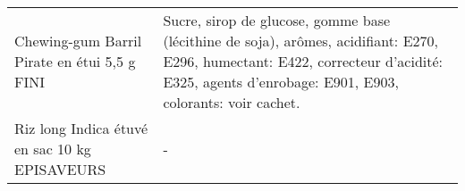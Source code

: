 \begin{longtable}{p{5cm}p{10cm}}
                                                             Chewing-gum Barril Pirate en étui 5,5 g FINI &                                                                                                                                                                                                                                                                                                                                                                                                                                                                                                                                                                                                                                                                                                                                                                                                                                             Sucre, sirop de glucose, gomme base (lécithine de soja), arômes, acidifiant: E270, E296, humectant: E422, correcteur d'acidité: E325, agents d'enrobage: E901, E903, colorants: voir cachet. \\
                                                            Riz long Indica étuvé en sac 10 kg EPISAVEURS &                                                                                                                                                                                                                                                                                                                                                                                                                                                                                                                                                                                                                                                                                                                                                                                                                                                                                                                                                                                                                                        - \\

\end{longtable}
